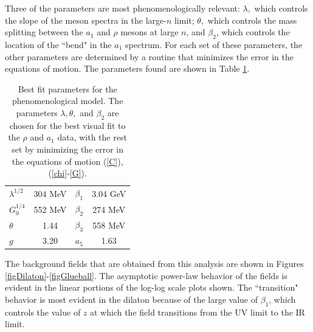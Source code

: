 \documentclass[aps,prd,12pt,nofootinbib]{revtex4}
\begin{document}
Three of the parameters are most phenomenologically relevant: $\lambda,$ which controls the slope of the meson spectra in the large-$n$ limit; $\theta,$ which controls the mass splitting between the $a_1$ and $\rho$ mesons at large $n$, and $\beta_2$, which controls the location of the ``bend" in the $a_1$ spectrum.
For each set of these parameters, the other parameters are determined by a routine that minimizes the error in the equations of motion. 
The parameters found are shown in Table \ref{tabParam}.

\begin{table}[htb]
\begin{center}
\begin{tabular}{| l | c || c | c | }
\hline
  $\lambda^{1/2}$ & $304$ MeV & $\beta_1$ & 3.04 GeV  \\
  $G_0^{1/4}$ & 552 MeV & $\beta_2$ & 274 MeV \\
  $ \theta $& 1.44 & $\beta_3$ & 558 MeV \\
  $g $& 3.20 & $a_5$ & 1.63 \\
  \hline
\end{tabular}
\caption{Best fit parameters for the phenomenological model. 
The parameters $\lambda, \theta,$ and $ \beta_2$ are chosen for the best visual fit to the $\rho$ and $a_1$ data, with the rest set by minimizing the error in the equations of motion (\ref{C}), (\ref{chi}-\ref{G}). }
\label{tabParam}
\end{center}
\end{table}

The background fields that are obtained from this analysis are shown in Figures \ref{figDilaton}-\ref{figGlueball}. 
The asymptotic power-law behavior of the fields is evident in the linear portions of the log-log scale plots shown.
 The ``transition" behavior is most evident in the dilaton because of the large value of $\beta_1$, which controls the value of $z$ at which the field transitions from the UV limit to the IR limit. 

\clearpage
\end{document}
